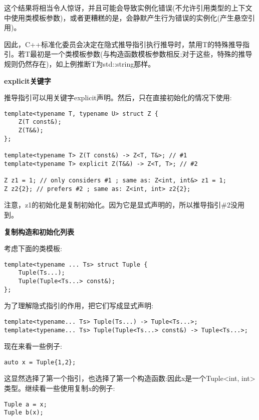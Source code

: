 这个结果将相当令人惊讶，并且可能会导致实例化错误(不允许引用类型的上下文中使用类模板参数)，或者更糟糕的是，会静默产生行为错误的实例化(产生悬空引用)。

因此，C++标准化委员会决定在隐式推导指引执行推导时，禁用T的特殊推导指引。若T最初是一个类模板参数(与构造函数模板参数相反;对于这些，特殊的推导规则仍然存在)，如上例推断T为std::string那样。

\noindent
\textbf{explicit关键字}

推导指引可以用关键字explicit声明。然后，只在直接初始化的情况下使用:

\begin{lstlisting}[style=styleCXX]
template<typename T, typename U> struct Z {
	Z(T const&);
	Z(T&&);
};

template<typename T> Z(T const&) -> Z<T, T&>; // #1
template<typename T> explicit Z(T&&) -> Z<T, T>; // #2

Z z1 = 1; // only considers #1 ; same as: Z<int, int&> z1 = 1;
Z z2{2}; // prefers #2 ; same as: Z<int, int> z2{2};
\end{lstlisting}

注意，z1的初始化是复制初始化。因为它是显式声明的，所以推导指引\#2没用到。

\noindent
\textbf{复制构造和初始化列表}

考虑下面的类模板:

\begin{lstlisting}[style=styleCXX]
template<typename ... Ts> struct Tuple {
	Tuple(Ts...);
	Tuple(Tuple<Ts...> const&);
};
\end{lstlisting}

为了理解隐式指引的作用，把它们写成显式声明:

\begin{lstlisting}[style=styleCXX]
template<typename... Ts> Tuple(Ts...) -> Tuple<Ts...>;
template<typename... Ts> Tuple(Tuple<Ts...> const&) -> Tuple<Ts...>;
\end{lstlisting}

现在来看一些例子:

\begin{lstlisting}[style=styleCXX]
auto x = Tuple{1,2};
\end{lstlisting}

这显然选择了第一个指引，也选择了第一个构造函数:因此x是一个Tuple<int, int>类型。继续看一些使用复制x的例子:

\begin{lstlisting}[style=styleCXX]
Tuple a = x;
Tuple b(x);
\end{lstlisting}


